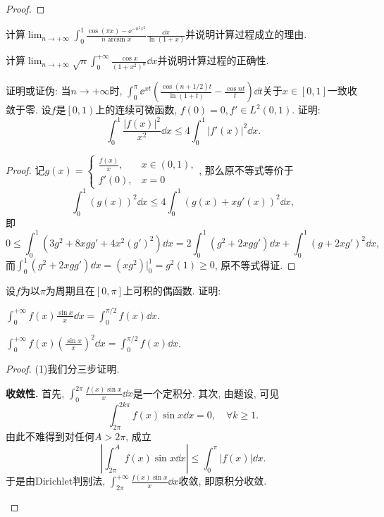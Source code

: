 \begin{quiza}
\begin{proof}
\end{proof}
\woe 计算\(\lim_{n\rightarrow+\infty}\int_{0}^{1}\frac{\cos(\pi x)-\ee^{-n^2x^2}}{n\arcsin x}\frac{\dd x}{\ln (1+x)}\)并说明计算过程成立的理由.
\begin{solution}

\end{solution}
\woe 计算\(\lim_{n\rightarrow+\infty}\sqrt{n}\int_{0}^{+\infty}\frac{\cos x}{(1+x^2)^n}\dd x\)并说明计算过程的正确性.
\begin{solution}

\end{solution}
\woe 证明或证伪: 当\(n\rightarrow+\infty\)时, \(\int_{0}^{\pi}\ee^{xt}\left(\frac{\cos\left(n+1/2\right)t}{\ln(1+t)}-\frac{\cos nt}{t}\right)\dd t\)关于\(x\in[0,1]\)一致收敛于零.
\woe 设\(f\)是\(\left[0,1\right)\)上的连续可微函数, \(f(0)=0,f'\in L^2(0,1)\). 证明: \[\int_{0}^{1}\frac{|f(x)|^2}{x^2}\dd x\leqslant 4\int_{0}^{1}|f'(x)|^2\dd x.\]
\begin{proof}
记\(g(x)=\begin{cases}
\frac{f(x)}{x},\quad &x\in(0,1),\\
f'(0),&x=0
\end{cases}\), 那么原不等式等价于\[\int_{0}^{1}\left(g(x)\right)^2\dd x\leqslant 4\int_{0}^{1}\left(g(x)+xg'(x)\right)^2\dd x,\]即\[0\leqslant\int_{0}^{1}\left(3g^2+8xgg'+4x^2(g')^2\right)\dd x=2\int_{0}^{1}\left(g^2+2xgg'\right)\dd x+\int_{0}^{1}\left(g+2xg'\right)^2\dd x,\]
而\(\int_{0}^{1}\left(g^2+2xgg'\right)\dd x=\left(xg^2\right)\Big|_0^1=g^2(1)\geqslant 0\), 原不等式得证.
\end{proof}
\woe 设\(f\)为以\(\pi\)为周期且在\([0,\pi]\)上可积的偶函数. 证明:
\begin{quizs}
\item \(\int_{0}^{+\infty}f(x)\frac{\sin x}{x}\dd x=\int_{0}^{\pi/2}f(x)\dd x\).
\item \(\int_{0}^{+\infty}f(x)\left(\frac{\sin x}{x}\right)^2\dd x=\int_{0}^{\pi/2}f(x)\dd x\).
\end{quizs}
\begin{proof}
(1)我们分三步证明.
\begin{asparaenum}[(i)]
\item\textbf{收敛性.} 首先, \(\int_{0}^{2\pi}\frac{f(x)\sin x}{x}\dd x\)是一个定积分. 其次, 由题设, 可见\[\int_{2\pi}^{2k\pi}f(x)\sin x\dd x=0,\quad\forall k\geqslant 1.\]由此不难得到对任何\(A>2\pi\), 成立\[\left|\int_{2\pi}^{A}f(x)\sin x\dd x\right|\leqslant\int_{0}^{\pi}\left|f(x)\right|\dd x.\]于是由Dirichlet判别法, \(\int_{2\pi}^{+\infty}\frac{f(x)\sin x}{x}\dd x\)收敛, 即原积分收敛.

\end{asparaenum}
\end{proof}
\end{quiza}
